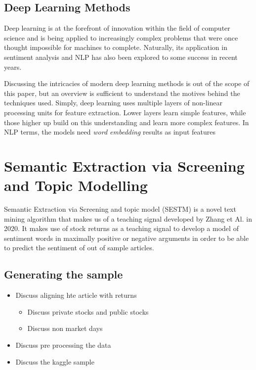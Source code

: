 \documentclass[ oneside,%
                    author={Joshua Felmeden},
                    degree={MEng},
                     title={Semantic Analysis of Financial Headlines Based on Realised Stock Returns},
                  subtitle={}]{dissertation}
\begin{document}
\subsection{Deep Learning Methods}
Deep learning is at the forefront of innovation within the field of computer science and is being applied to increasingly complex problems that were once thought impossible for machines to complete. Naturally, its application in sentiment analysis and NLP has also been explored to some success in recent years.

Discussing the intricacies of modern deep learning methods is out of the scope of this paper, but an overview is sufficient to understand the motives behind the techniques used. Simply, deep learning uses multiple layers of non-linear processing units for feature extraction. Lower layers learn simple features, while those higher up build on this understanding and learn more complex features. In NLP terms, the models need \textit{word embedding} results as input features 

\section{Semantic Extraction via Screening and Topic Modelling}
Semantic Extraction via Screening and topic model (SESTM) is a novel text mining algorithm that makes us of a teaching signal developed by Zhang et Al. in 2020. It makes use of stock returns as a teaching signal to develop a model of sentiment words in maximally positive or negative arguments in order to be able to predict the sentiment of out of sample articles.

\subsection{Generating the sample}
\begin{itemize}
      \item Discuss aligning hte article with returns
      \begin{itemize}
            \item Discuss private stocks and public stocks
            \item Discuss non market days
      \end{itemize}
      \item Discuss pre processing the data
      \item Discuss the kaggle sample
\end{itemize}
\end{document}
